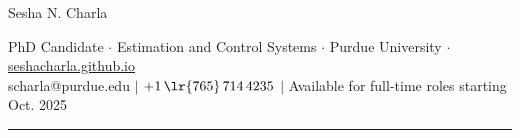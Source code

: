 \documentclass[letterpaper, 10pt]{article}
\begin{document}
\begin{center}
        \huge
        Sesha N. Charla
\end{center}
\begin{center}
        PhD Candidate $\cdot$
        Estimation and Control Systems $\cdot$
        Purdue University $\cdot$
        \href{https://seshacharla.github.io}{seshacharla.github.io}\\
        scharla@purdue.edu $|$
        $+1\,\lr{765}\, 714 \, 4235$ $|$
        Available for full-time roles starting Oct. 2025
\end{center}

\noindent\rule{\textwidth}{0.4pt}







\end{document}
